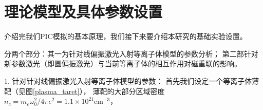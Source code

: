 \section[\textnormal{理论模型及具体参数设置}]{\textbf{理论模型及具体参数设置}}

介绍完我们PIC模拟的基本原理，我们接下来要介绍本研究的基础实验设置。

分两个部分：其一为针对线偏振激光入射等离子体模型的参数分析；
第二部针对新参数激光（即圆偏振激光）与当前等离子体的相互作用对磁重联的影响。

1. 针对针对线偏振激光入射等离子体模型的参数\cite{Yi_2018}：
首先我们设定一个等离子体薄靶（见图\ref{plasma_taret}），
薄靶的大部分区域密度$n_c=m_e\omega_0^2/4\pi e^2=1.1\times10^{21}\mathrm{cm}^{-3}$，\\
\begin{figure}[H]
    \centering

    \begin{tikzpicture}[x=0.75pt,y=0.75pt,yscale=-1,xscale=1]
    

\end{tikzpicture}
\end{figure}
